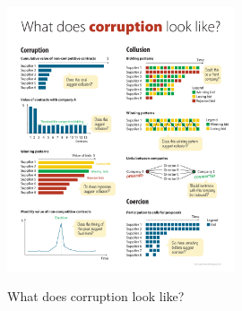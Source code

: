\begin{figure}[H]
\begin{center}
\caption{What does corruption look like?}\includegraphics[max width=0.6\textwidth]{../img/poster_what.pdf}
\label{fig_what_corr}
\end{center}



\end{figure}
